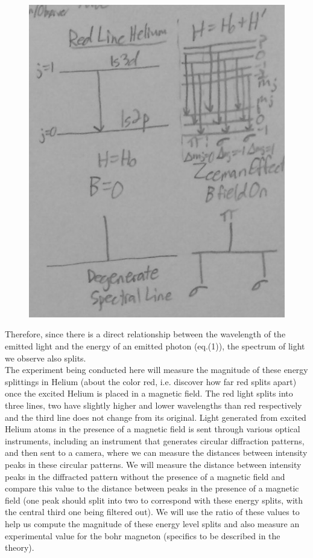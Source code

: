 \documentclass{article}
\begin{document}
        \begin{figure}[H]
    \centering
    \includegraphics[scale = 0.2]{ATM1d.jpg}
    \caption{}
    \label{fig:my_label}
\end{figure} 
        Therefore, since there is a direct relationship between the wavelength of the emitted light and the energy of an emitted photon (eq.(1)), the spectrum of light we observe also splits. \\\indent The experiment being conducted here will measure the magnitude of these energy splittings in Helium (about the color red, i.e. discover how far red splits apart) once the excited Helium is placed in a magnetic field. The red light splits into three lines, two have slightly higher and lower wavelengths than red respectively and the third line does not change from its original. Light generated from excited Helium atoms in the presence of a magnetic field is sent through various optical instruments, including an instrument that generates circular diffraction patterns, and then sent to a camera, where we can measure the distances between intensity peaks in these circular patterns. We will measure the distance between intensity peaks in the diffracted pattern without the presence of a magnetic field and compare this value to the distance between peaks in the presence of a magnetic field (one peak should split into two to correspond with these energy splits, with the central third one being filtered out). We will use the ratio of these values to help us compute the magnitude of these energy level splits and also measure an experimental value for the bohr magneton (specifics to be described in the theory).
\end{document}
